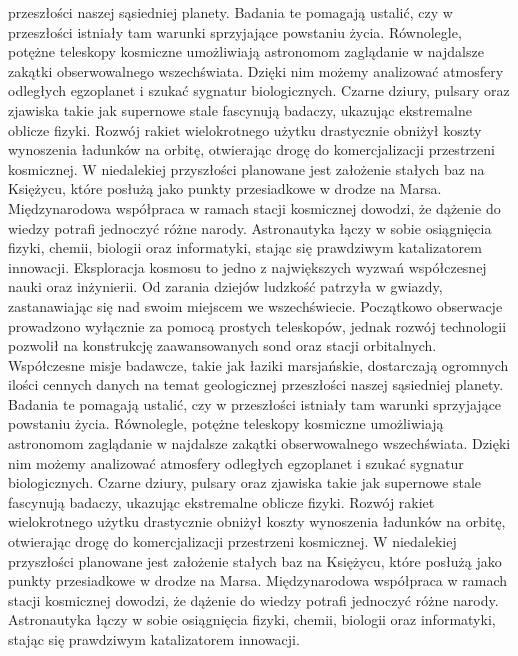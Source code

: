 \documentclass[12pt,a4paper]{article}
\begin{document}
przeszłości naszej sąsiedniej planety. Badania te pomagają ustalić, czy w przeszłości istniały tam warunki sprzyjające powstaniu życia. Równolegle, potężne teleskopy kosmiczne umożliwiają astronomom zaglądanie w najdalsze zakątki obserwowalnego wszechświata. Dzięki nim możemy analizować atmosfery odległych egzoplanet i szukać sygnatur biologicznych. Czarne dziury, pulsary oraz zjawiska takie jak supernowe stale fascynują badaczy, ukazując ekstremalne oblicze fizyki. Rozwój rakiet wielokrotnego użytku drastycznie obniżył koszty wynoszenia ładunków na orbitę, otwierając drogę do komercjalizacji przestrzeni kosmicznej. W niedalekiej przyszłości planowane jest założenie stałych baz na Księżycu, które posłużą jako punkty przesiadkowe w drodze na Marsa. Międzynarodowa współpraca w ramach stacji kosmicznej dowodzi, że dążenie do wiedzy potrafi jednoczyć różne narody. Astronautyka łączy w sobie osiągnięcia fizyki, chemii, biologii oraz informatyki, stając się prawdziwym katalizatorem innowacji. Eksploracja kosmosu to jedno z największych wyzwań współczesnej nauki oraz inżynierii. Od zarania dziejów ludzkość patrzyła w gwiazdy, zastanawiając się nad swoim miejscem we wszechświecie. Początkowo obserwacje prowadzono wyłącznie za pomocą prostych teleskopów, jednak rozwój technologii pozwolił na konstrukcję zaawansowanych sond oraz stacji orbitalnych. Współczesne misje badawcze, takie jak łaziki marsjańskie, dostarczają ogromnych ilości cennych danych na temat geologicznej przeszłości naszej sąsiedniej planety. Badania te pomagają ustalić, czy w przeszłości istniały tam warunki sprzyjające powstaniu życia. Równolegle, potężne teleskopy kosmiczne umożliwiają astronomom zaglądanie w najdalsze zakątki obserwowalnego wszechświata. Dzięki nim możemy analizować atmosfery odległych egzoplanet i szukać sygnatur biologicznych. Czarne dziury, pulsary oraz zjawiska takie jak supernowe stale fascynują badaczy, ukazując ekstremalne oblicze fizyki. Rozwój rakiet wielokrotnego użytku drastycznie obniżył koszty wynoszenia ładunków na orbitę, otwierając drogę do komercjalizacji przestrzeni kosmicznej. W niedalekiej przyszłości planowane jest założenie stałych baz na Księżycu, które posłużą jako punkty przesiadkowe w drodze na Marsa. Międzynarodowa współpraca w ramach stacji kosmicznej dowodzi, że dążenie do wiedzy potrafi jednoczyć różne narody. Astronautyka łączy w sobie osiągnięcia fizyki, chemii, biologii oraz informatyki, stając się prawdziwym katalizatorem innowacji.
\end{document}
